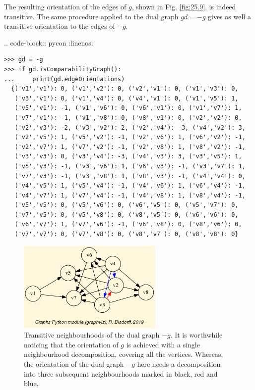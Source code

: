 The resulting orientation of the edges of $g$, shown in Fig. \ref{fig:25.9}, is indeed transitive. The same procedure applied to the dual graph $gd = -g$ gives as well a transitive orientation to the edges of $-g$.

.. code-block:: pycon
   :linenos:

\begin{lstlisting}[basicstyle=\scriptsize]
>>> gd = -g
>>> if gd.isComparabilityGraph():
...     print(gd.edgeOrientations) 
  {('v1','v1'): 0, ('v1','v2'): 0, ('v2','v1'): 0, ('v1','v3'): 0,
   ('v3','v1'): 0, ('v1','v4'): 0, ('v4','v1'): 0, ('v1','v5'): 1,
   ('v5','v1'): -1, ('v1','v6'): 0, ('v6','v1'): 0, ('v1','v7'): 1,
   ('v7','v1'): -1, ('v1','v8'): 0, ('v8','v1'): 0, ('v2','v2'): 0,
   ('v2','v3'): -2, ('v3','v2'): 2, ('v2','v4'): -3, ('v4','v2'): 3,
   ('v2','v5'): 1, ('v5','v2'): -1, ('v2','v6'): 1, ('v6','v2'): -1,
   ('v2','v7'): 1, ('v7','v2'): -1, ('v2','v8'): 1, ('v8','v2'): -1,
   ('v3','v3'): 0, ('v3','v4'): -3, ('v4','v3'): 3, ('v3','v5'): 1,
   ('v5','v3'): -1, ('v3','v6'): 1, ('v6','v3'): -1, ('v3','v7'): 1,
   ('v7','v3'): -1, ('v3','v8'): 1, ('v8','v3'): -1, ('v4','v4'): 0,
   ('v4','v5'): 1, ('v5','v4'): -1, ('v4','v6'): 1, ('v6','v4'): -1,
   ('v4','v7'): 1, ('v7','v4'): -1, ('v4','v8'): 1, ('v8','v4'): -1,
   ('v5','v5'): 0, ('v5','v6'): 0, ('v6','v5'): 0, ('v5','v7'): 0,
   ('v7','v5'): 0, ('v5','v8'): 0, ('v8','v5'): 0, ('v6','v6'): 0,
   ('v6','v7'): 1, ('v7','v6'): -1, ('v6','v8'): 0, ('v8','v6'): 0,
   ('v7','v7'): 0, ('v7','v8'): 0, ('v8','v7'): 0, ('v8','v8'): 0}
\end{lstlisting}
\begin{figure}[h]
\sidecaption
\includegraphics[width=7cm]{Figures/transOrientDualGraph.png}
\caption{Transitive neighbourhoods of the dual graph $-g$. It is worthwhile noticing that the orientation of $g$ is achieved with a single neighbourhood decomposition, covering all the vertices. Whereas, the orientation of the dual graph $-g$ here needs a decomposition into three subsequent neighbourhoods marked in black, red and blue.} 
\label{fig:25.10}       %
\end{figure}
 
